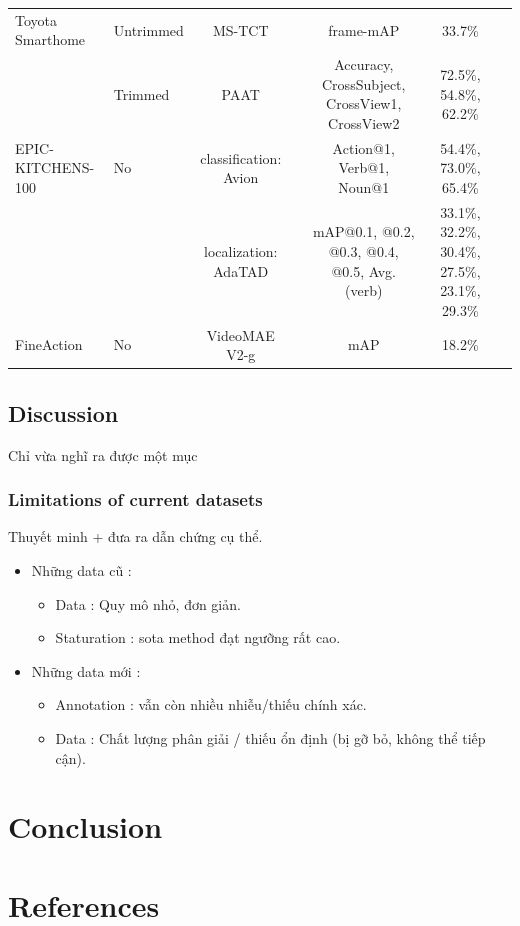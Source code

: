 \documentclass[a4paper]{article}
\begin{document}
\begin{table}
\begin{tabular}{l|l|c c c c c}
		Toyota Smarthome        & Untrimmed     & MS-TCT                        & \cite{MS-TCT}        & frame-mAP                                      & 33.7\%	                                    \\
								& Trimmed       & PAAT                          & \cite{PAAT}          & Accuracy, CrossSubject, CrossView1, CrossView2 & 72.5\%, 54.8\%, 62.2\%	  \\
		EPIC-KITCHENS-100       & No            & classification: Avion         & \cite{Avion}         & Action@1, Verb@1, Noun@1                       & 54.4\%, 73.0\%, 65.4\%                            \\	
								&               & localization: AdaTAD          & \cite{AdaTAD}        & mAP@0.1, @0.2, @0.3, @0.4, @0.5, Avg. (verb)   & 33.1\%, 32.2\%, 30.4\%, 27.5\%, 23.1\%, 29.3\% \\
		FineAction              & No            & VideoMAE V2-g                 & \cite{VideoMAEV2g}   & mAP                                            & 18.2\%                   \\
		\bottomrule
		
	\end{tabular}%
	\label{BenchmarkMetric}
\end{table}%


\subsection{Discussion}

Chỉ vừa nghĩ ra được một mục

\subsubsection{Limitations of current datasets}

Thuyết minh + đưa ra dẫn chứng cụ thể.

\begin{itemize}
	\item Những data cũ :
	\begin{itemize}
		\item Data : Quy mô nhỏ, đơn giản.
		\item Staturation : sota method đạt ngưỡng rất cao.
	\end{itemize}
	
	\item Những data mới :
	\begin{itemize}
		\item Annotation : vẫn còn nhiều nhiễu/thiếu chính xác.
		\item Data : Chất lượng phân giải / thiếu ổn định (bị gỡ bỏ, không thể tiếp cận).
	\end{itemize}
	
\end{itemize}

\section{Conclusion}

\section{References}



\end{document}

